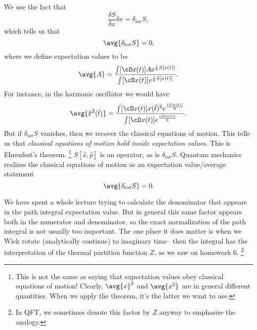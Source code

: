 We use the fact that
\begin{equation}
    \frac{\delta S}{\delta x} \delta x = \delta_\text{tot} S,
\end{equation}
which tells us that
\begin{equation}
    \avg{\delta_\text{tot} S} = 0,
\end{equation}
where we define expectation values to be
\begin{equation}
    \avg{A} = \frac{\int [\cD x(t)] A e^{\frac{i}{\hbar}S[x(t)]}}{\int [\cD x(t)] e^{\frac{i}{\hbar}S[x(t)]}}.
\end{equation}
For instance, in the harmonic oscillator we would have
\begin{equation}
    \avg{\hat x^2(\tilde t)} = \frac{\int [\cD x(t)]x(\tilde t)^2 e^{\frac{iS[x(t)]}{\hbar}}}{\int [\cD x(t)] e^{\frac{iS[x(t)]}{\hbar}}}.
\end{equation}
But if $\delta_\text{tot} S$ vanishes, then we recover the classical equations of motion. This tells us that \emph{classical equations of motion hold inside expectation values}. This is Ehrenfest's theorem.%
    \footnote{This is not the same as saying that expectation values obey classical equations of motion! Clearly, $\avg{x}^2$ and $\avg{x^2}$ are in general different quantities. When we apply the theorem, it's the latter we want to use.}
$S[\hat x, \hat p]$ is an operator, as is $\delta_\text{tot}S$. Quantum mechanics realizes the classical equations of motion as an expectation value/average statement
\begin{equation}
    \avg{\delta_\text{tot}S} =0.
\end{equation}

We have spent a whole lecture trying to calculate the denominator that appears in the path integral expectation value. But in general this same factor appears both in the numerator and denominator, so the exact normalization of the path integral is not usually too important. The one place it does matter is when we Wick rotate (analytically continue) to imaginary time-- then the integral has the interpretation of the thermal partition function $Z$, as we saw on homework 6.%
    \footnote{In QFT, we sometimes denote this factor by $Z$ anyway to emphasize the analogy.}

